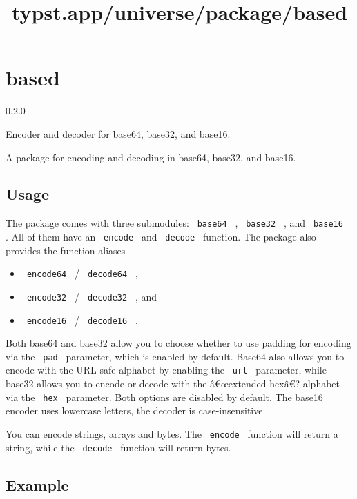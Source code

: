 \title{typst.app/universe/package/based}

\label{banner}
\section{based}\label{based}

{ 0.2.0 }

Encoder and decoder for base64, base32, and base16.

\label{readme}
A package for encoding and decoding in base64, base32, and base16.

\subsection{Usage}\label{usage}

The package comes with three submodules: \texttt{\ base64\ } ,
\texttt{\ base32\ } , and \texttt{\ base16\ } . All of them have an
\texttt{\ encode\ } and \texttt{\ decode\ } function. The package also
provides the function aliases

\begin{itemize}
\tightlist
\item
  \texttt{\ encode64\ } / \texttt{\ decode64\ } ,
\item
  \texttt{\ encode32\ } / \texttt{\ decode32\ } , and
\item
  \texttt{\ encode16\ } / \texttt{\ decode16\ } .
\end{itemize}

Both base64 and base32 allow you to choose whether to use padding for
encoding via the \texttt{\ pad\ } parameter, which is enabled by
default. Base64 also allows you to encode with the URL-safe alphabet by
enabling the \texttt{\ url\ } parameter, while base32 allows you to
encode or decode with the â€œextended hexâ€? alphabet via the
\texttt{\ hex\ } parameter. Both options are disabled by default. The
base16 encoder uses lowercase letters, the decoder is case-insensitive.

You can encode strings, arrays and bytes. The \texttt{\ encode\ }
function will return a string, while the \texttt{\ decode\ } function
will return bytes.

\subsection{Example}\label{example}

